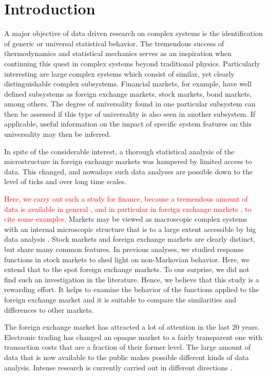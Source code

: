 \section{Introduction}\label{sec:introduction}

A major objective of data driven research on complex systems is the
identification of generic or universal statistical behavior. The tremendous
success of thermodynamics and statistical mechanics serves as an inspiration
when continuing this quest in complex systems beyond traditional physics.
Particularly interesting are large complex systems which consist of similar,
yet clearly distinguishable complex subsystems. Financial markets, for example,
have well defined subsystems as foreign exchange markets, stock markets, bond
markets, among others. The degree of universality found in one particular
subsystem can then be assessed if this type of universality is also seen in
another subsystem. If applicable, useful information on the impact of specific
system features on this universality may then be inferred.

In spite of the considerable interest, a thorough statistical analysis of
the microstructure in foreign exchange markets was hampered by limited access
to data. This changed, and nowadays such data analyses are possible down to the
level of ticks and over long time scales.

\textcolor{red}{Here, we carry out such a study for finance, because  a tremendous
amount of data is available in general
\cite{physicists_contribution,data_01,data_02,data_03,data_04}, and in particular
in foreign exchange markets \cite{data_05,forex_microstructure,data_06}, to cite some
examples.} Markets may be viewed as
macroscopic complex systems with an internal microscopic structure that is to a
large extent accessible by big data analysis \cite{complex_markets}.
Stock markets and foreign exchange markets are clearly distinct, but share many
common features. In previous analyses, we studied response functions in stock
markets to shed light on non-Markovian behavior. Here, we extend that to the
spot foreign exchange markets. To our surprise, we did not find such an
investigation in the literature. Hence, we believe that this study is a
rewarding effort. It helps to examine the behavior of the functions applied to
the foreign exchange market and it is suitable to compare the similarities and
differences to other markets.

The foreign exchange market has attracted a lot of attention in the last 20
years. Electronic trading has changed an opaque market to a fairly transparent
one with transaction costs that are a fraction of their former level. The large
amount of data that is now available to the public makes possible different
kinds of data analysis. Intense research is currently carried out in different
directions
\cite{forex_liquidity,info_forex,intraday_forex,forex_structure,teach_spread,forex_microstructure,electronic_forex,forex_algorithmic,curr_speculation,patterns_forex,eur_change_forex,spread_competition,political_forex,forex_volatility,local_forex,forex_inefficiency}.

